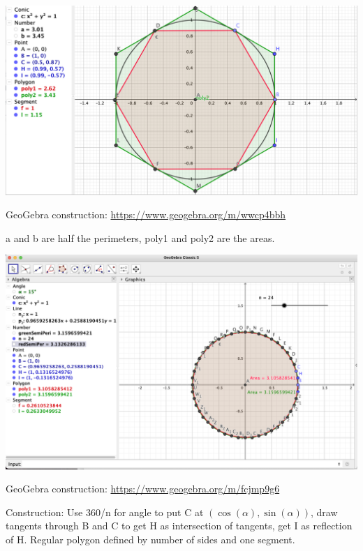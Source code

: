 \documentclass{beamer}
\begin{document}
\begin{frame}

    \includegraphics[width=\textwidth]{Images/hexagon-circle.png}

  GeoGebra construction:  \url{https://www.geogebra.org/m/wwcp4bbh}
  
  a and b are half the perimeters, poly1 and poly2 are the areas.
\end{frame}


\begin{frame}

   \includegraphics[width=\textwidth]{Images/flexible-hexagon-circle-24.png}

  GeoGebra construction:  \url{https://www.geogebra.org/m/fcjmp9g6}
  \begin{tiny}
  Construction: Use 360/n for angle to put C at $(\cos(\alpha), \sin(\alpha))$, draw tangents through B and C to get H as intersection of tangents,  get I as reflection of H. Regular polygon defined by number of sides and one segment. 
  
  \end{tiny}
\end{frame}
\end{document}
